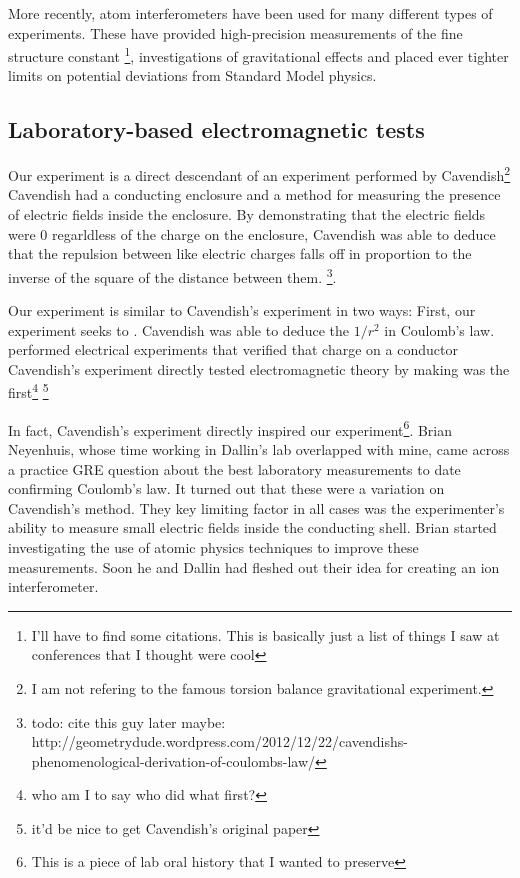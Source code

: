 More recently, atom interferometers have been used for many different types of experiments. These have provided high-precision measurements of the fine structure constant \footnote{I'll have to find some citations. This is basically just a list of things I saw at conferences that I thought were cool}, investigations of gravitational effects and placed ever tighter limits on potential deviations from Standard Model physics. 

\subsection{Laboratory-based electromagnetic tests}
Our experiment is a direct descendant of an experiment performed by Cavendish\footnote{I am not refering to the famous torsion balance gravitational experiment.} Cavendish had a conducting enclosure and a method for measuring the presence of electric fields inside the enclosure. By demonstrating that the electric fields were 0 regarldless of the charge on the enclosure, Cavendish was able to deduce that the repulsion between like electric charges falls off in proportion to the inverse of the square of the distance between them. \footnote{todo: cite this guy later maybe:  http://geometrydude.wordpress.com/2012/12/22/cavendishs-phenomenological-derivation-of-coulombs-law/}. 

Our experiment is similar to Cavendish's experiment in two ways: First, our experiment seeks to . Cavendish was able to deduce the $1/r^2$ in Coulomb's law. performed electrical experiments that verified that charge on a conductor Cavendish's experiment directly tested electromagnetic theory by making was the first\footnote{who am I to say who did what first?}\cite{jackson} \footnote{it'd be nice to get Cavendish's original paper}  

In fact, Cavendish's experiment directly inspired our experiment\footnote{This is a piece of lab oral history that I wanted to preserve}. Brian Neyenhuis, whose time working in Dallin's lab overlapped with mine, came across a practice GRE question about the best laboratory measurements to date confirming Coulomb's law. It turned out that these were a variation on Cavendish's method. They key limiting factor in all cases was the experimenter's ability to measure small electric fields inside the conducting shell. Brian started investigating the use of atomic physics techniques to improve these measurements. Soon he and Dallin had fleshed out their idea for creating an ion interferometer.  

